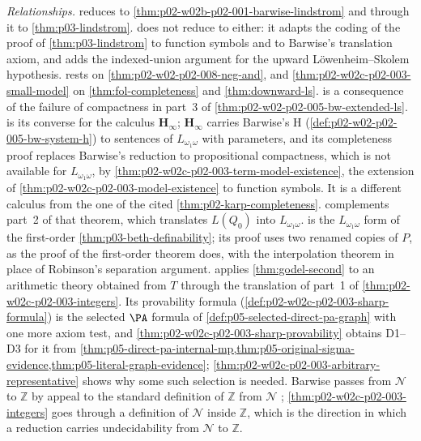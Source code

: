 \emph{Relationships.}  
reduces to \cref{thm:p02-w02b-p02-001-barwise-lindstrom} and through it
to \cref{thm:p03-lindstrom}.  
does not reduce to either: it adapts the coding of the proof of
\cref{thm:p03-lindstrom} to function symbols and to Barwise's translation
axiom, and adds the indexed-union argument for the upward
L\"owenheim--Skolem hypothesis.   rests on
\cref{thm:p02-w02-p02-008-neg-and}, and
\cref{thm:p02-w02c-p02-003-small-model} on \cref{thm:fol-completeness} and
\cref{thm:downward-ls}.
 is a consequence of the
failure of compactness in part~3 of
\cref{thm:p02-w02-p02-005-bw-extended-ls}.
 is its converse for the
calculus \(\mathbf H_{\infty}\); \(\mathbf H_{\infty}\) carries Barwise's H
(\cref{def:p02-w02-p02-005-bw-system-h}) to sentences of
\(L_{\omega_1\omega}\) with parameters, and its completeness proof replaces
Barwise's reduction to propositional compactness, which is not available
for \(L_{\omega_1\omega}\), by
\cref{thm:p02-w02c-p02-003-term-model-existence}, the extension of
\cref{thm:p02-w02c-p02-003-model-existence} to function symbols.  It is a
different calculus from the one of the cited
\cref{thm:p02-karp-completeness}.
 complements part~2 of that
theorem, which translates \(L(Q_0)\) into \(L_{\omega_1\omega}\).
 is the \(L_{\omega_1\omega}\) form of
the first-order \cref{thm:p03-beth-definability}; its proof uses two
renamed copies of \(P\), as the proof of the first-order theorem does,
with the interpolation theorem in place of Robinson's separation
argument.
 applies
\cref{thm:godel-second} to an arithmetic theory obtained from \(T\)
through the translation of part~1 of
\cref{thm:p02-w02c-p02-003-integers}.  Its provability formula
(\cref{def:p02-w02c-p02-003-sharp-formula}) is the selected \(\PA\) formula
of \cref{def:p05-selected-direct-pa-graph} with one more axiom test, and
\cref{thm:p02-w02c-p02-003-sharp-provability} obtains D1--D3 for it from
\cref{thm:p05-direct-pa-internal-mp,thm:p05-original-sigma-evidence,thm:p05-literal-graph-evidence};
\cref{thm:p02-w02c-p02-003-arbitrary-representative} shows why some such
selection is needed.
Barwise passes from \(\mathcal N\) to \(\mathbb Z\) by appeal to the
standard definition of \(\mathbb Z\) from \(\mathcal N\)
\cite[ch.~A.1, \S2, p.~16]{Barwise1977FirstOrder};
\cref{thm:p02-w02c-p02-003-integers} goes through a definition of
\(\mathcal N\) inside \(\mathbb Z\), which is the direction in which a
reduction carries undecidability from \(\mathcal N\) to \(\mathbb Z\).

